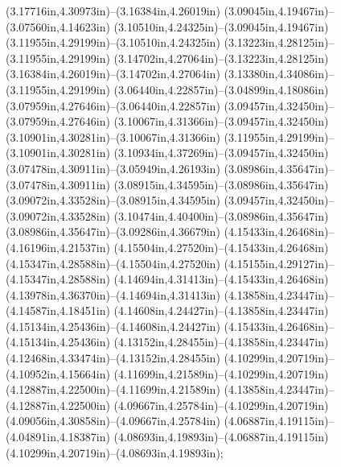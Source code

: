 (3.17716in,4.30973in)--(3.16384in,4.26019in) (3.09045in,4.19467in)--(3.07560in,4.14623in) (3.10510in,4.24325in)--(3.09045in,4.19467in) (3.11955in,4.29199in)--(3.10510in,4.24325in) (3.13223in,4.28125in)--(3.11955in,4.29199in) (3.14702in,4.27064in)--(3.13223in,4.28125in) (3.16384in,4.26019in)--(3.14702in,4.27064in) (3.13380in,4.34086in)--(3.11955in,4.29199in) (3.06440in,4.22857in)--(3.04899in,4.18086in) (3.07959in,4.27646in)--(3.06440in,4.22857in) (3.09457in,4.32450in)--(3.07959in,4.27646in) (3.10067in,4.31366in)--(3.09457in,4.32450in) (3.10901in,4.30281in)--(3.10067in,4.31366in) (3.11955in,4.29199in)--(3.10901in,4.30281in) (3.10934in,4.37269in)--(3.09457in,4.32450in) (3.07478in,4.30911in)--(3.05949in,4.26193in) (3.08986in,4.35647in)--(3.07478in,4.30911in) (3.08915in,4.34595in)--(3.08986in,4.35647in) (3.09072in,4.33528in)--(3.08915in,4.34595in) (3.09457in,4.32450in)--(3.09072in,4.33528in) (3.10474in,4.40400in)--(3.08986in,4.35647in) (3.08986in,4.35647in)--(3.09286in,4.36679in) (4.15433in,4.26468in)--(4.16196in,4.21537in) (4.15504in,4.27520in)--(4.15433in,4.26468in) (4.15347in,4.28588in)--(4.15504in,4.27520in) (4.15155in,4.29127in)--(4.15347in,4.28588in) (4.14694in,4.31413in)--(4.15433in,4.26468in) (4.13978in,4.36370in)--(4.14694in,4.31413in) (4.13858in,4.23447in)--(4.14587in,4.18451in) (4.14608in,4.24427in)--(4.13858in,4.23447in) (4.15134in,4.25436in)--(4.14608in,4.24427in) (4.15433in,4.26468in)--(4.15134in,4.25436in) (4.13152in,4.28455in)--(4.13858in,4.23447in) (4.12468in,4.33474in)--(4.13152in,4.28455in) (4.10299in,4.20719in)--(4.10952in,4.15664in) (4.11699in,4.21589in)--(4.10299in,4.20719in) (4.12887in,4.22500in)--(4.11699in,4.21589in) (4.13858in,4.23447in)--(4.12887in,4.22500in) (4.09667in,4.25784in)--(4.10299in,4.20719in) (4.09056in,4.30858in)--(4.09667in,4.25784in) (4.06887in,4.19115in)--(4.04891in,4.18387in) (4.08693in,4.19893in)--(4.06887in,4.19115in) (4.10299in,4.20719in)--(4.08693in,4.19893in);
